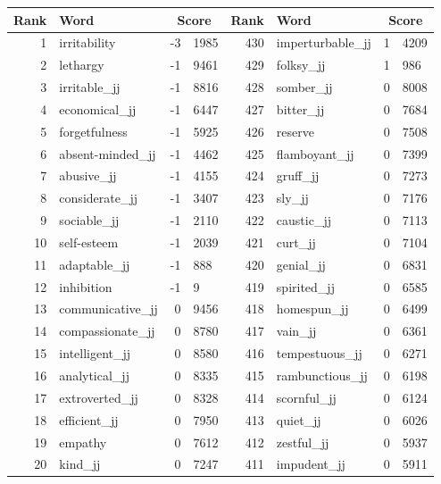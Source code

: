 \begin{table}[tbp]
    \begin{tabular}{| rlr@{.}l | rlr@{.}l |}
    \hline
    \textbf{Rank} & \textbf{Word} & \multicolumn{2}{c|}{\textbf{Score}} & \textbf{Rank} & \textbf{Word} & \multicolumn{2}{c|}{\textbf{Score}} \\
    \hline
    1 & irritability & -3 & 1985    &    430 & imperturbable\_jj & 1 & 4209 \\
    2 & lethargy & -1 & 9461    &    429 & folksy\_jj & 1 & 986 \\
    3 & irritable\_jj & -1 & 8816    &    428 & somber\_jj & 0 & 8008 \\
    4 & economical\_jj & -1 & 6447    &    427 & bitter\_jj & 0 & 7684 \\
    5 & forgetfulness & -1 & 5925    &    426 & reserve & 0 & 7508 \\
    6 & absent-minded\_jj & -1 & 4462    &    425 & flamboyant\_jj & 0 & 7399 \\
    7 & abusive\_jj & -1 & 4155    &    424 & gruff\_jj & 0 & 7273 \\
    8 & considerate\_jj & -1 & 3407    &    423 & sly\_jj & 0 & 7176 \\
    9 & sociable\_jj & -1 & 2110    &    422 & caustic\_jj & 0 & 7113 \\
    10 & self-esteem & -1 & 2039    &    421 & curt\_jj & 0 & 7104 \\
    11 & adaptable\_jj & -1 & 888    &    420 & genial\_jj & 0 & 6831 \\
    12 & inhibition & -1 & 9    &    419 & spirited\_jj & 0 & 6585 \\
    13 & communicative\_jj & 0 & 9456    &    418 & homespun\_jj & 0 & 6499 \\
    14 & compassionate\_jj & 0 & 8780    &    417 & vain\_jj & 0 & 6361 \\
    15 & intelligent\_jj & 0 & 8580    &    416 & tempestuous\_jj & 0 & 6271 \\
    16 & analytical\_jj & 0 & 8335    &    415 & rambunctious\_jj & 0 & 6198 \\
    17 & extroverted\_jj & 0 & 8328    &    414 & scornful\_jj & 0 & 6124 \\
    18 & efficient\_jj & 0 & 7950    &    413 & quiet\_jj & 0 & 6026 \\
    19 & empathy & 0 & 7612    &    412 & zestful\_jj & 0 & 5937 \\
    20 & kind\_jj & 0 & 7247    &    411 & impudent\_jj & 0 & 5911 \\

\end{tabular}
\end{table}
